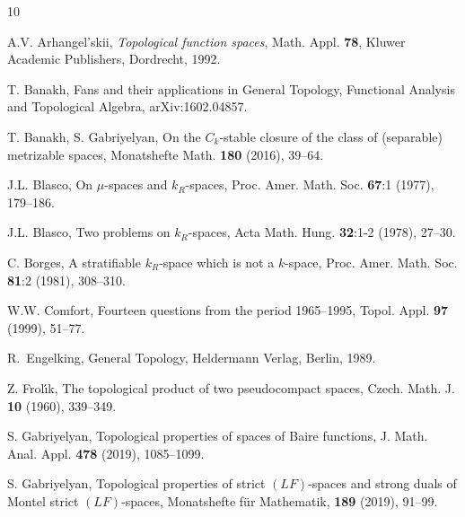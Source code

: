 \documentclass[preprint,11pt]{elsarticle}
\numberwithin{equation}{section}
\numberwithin{theorem}{section}
\newcommand{\CC}{C_k}
\begin{document}

\begin{thebibliography}{10}


A.V. Arhangel'skii, \emph{Topological function spaces}, Math. Appl. \textbf{78}, Kluwer Academic Publishers, Dordrecht, 1992.


T. Banakh, Fans and their applications in General Topology, Functional Analysis and Topological Algebra,  arXiv:1602.04857.

T. Banakh, S. Gabriyelyan,  On the $\CC$-stable closure of the class of (separable) metrizable spaces, Monatshefte Math.   \textbf{180} (2016), 39--64.

J.L. Blasco, On $\mu$-spaces and $k_R$-spaces, Proc. Amer. Math. Soc.  \textbf{67}:1 (1977), 179--186.

J.L. Blasco, Two problems on $k_R$-spaces, Acta Math. Hung. \textbf{32}:1-2 (1978),  27--30.


C. Borges, A stratifiable $k_R$-space which is not a $k$-space, Proc. Amer. Math. Soc.  \textbf{81}:2 (1981),  308--310.


W.W. Comfort, Fourteen questions from the period 1965--1995, Topol. Appl. \textbf{97} (1999), 51--77.



R.~Engelking, General Topology, Heldermann Verlag, Berlin, 1989.

Z. Frol\'{\i}k, The topological product of two pseudocompact spaces, Czech. Math. J. \textbf{10}  (1960), 339--349.


S. Gabriyelyan, Topological properties of spaces of Baire functions, J. Math. Anal. Appl. \textbf{478} (2019), 1085--1099.

S. Gabriyelyan, Topological properties of strict $(LF)$-spaces and strong duals of Montel  strict $(LF)$-spaces,  Monatshefte f\"{u}r Mathematik,  \textbf{189} (2019), 91--99.


\end{thebibliography}
\end{document}
